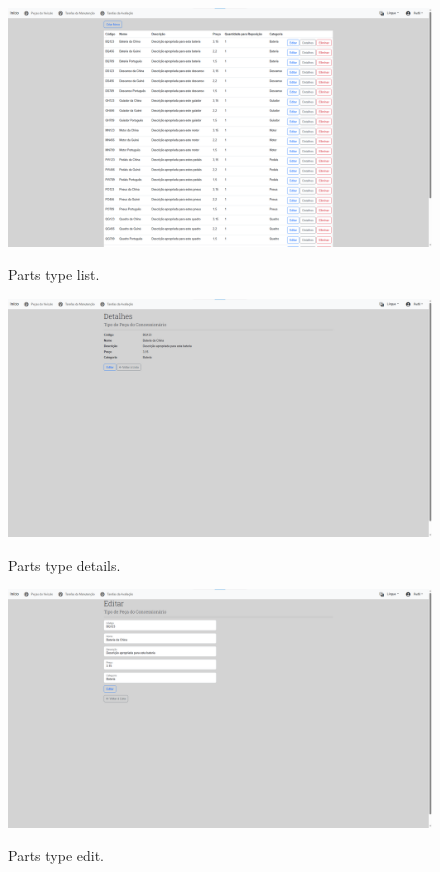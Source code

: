 \begin{figure}[h]
  \caption{Parts type list.}
  \centering
  \includegraphics[width=\textwidth]{figs/Implementation/dealershipAdmin/partsIndex}
  \label{fig:partsIndex}
\end{figure}


\begin{figure}[h]
  \caption{Parts type details.}
  \centering
  \includegraphics[width=\textwidth]{figs/Implementation/dealershipAdmin/partsDetails}
  \label{fig:partsDetails}
\end{figure}

\begin{figure}[h]
  \caption{Parts type edit.}
  \centering
  \includegraphics[width=\textwidth]{figs/Implementation/dealershipAdmin/partsEdit}
  \label{fig:partsEdit}
\end{figure}

